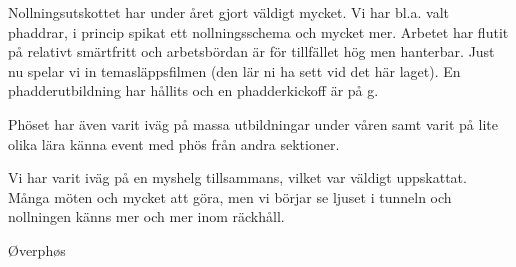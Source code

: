 \documentclass[../_main/handlingar.tex]{subfiles}
\begin{document}
Nollningsutskottet har under året gjort väldigt mycket. Vi har bl.a. valt phaddrar, i princip spikat ett nollningsschema och mycket mer. Arbetet har flutit på relativt smärtfritt och arbetsbördan är för tillfället hög men hanterbar. Just nu spelar vi in temasläppsfilmen (den lär ni ha sett vid det här laget). En phadderutbildning har hållits och en phadderkickoff är på g.

Phöset har även varit iväg på massa utbildningar under våren samt varit på lite olika lära känna event med phös från andra sektioner.

Vi har varit iväg på en myshelg tillsammans, vilket var väldigt uppskattat. Många möten och mycket att göra, men vi börjar se ljuset i tunneln och nollningen känns mer och mer inom räckhåll.

\begin{signatures}{1}
    \mvh
    \signature{Niklas Gustafson}{Øverphøs}
\end{signatures}
\end{document}
